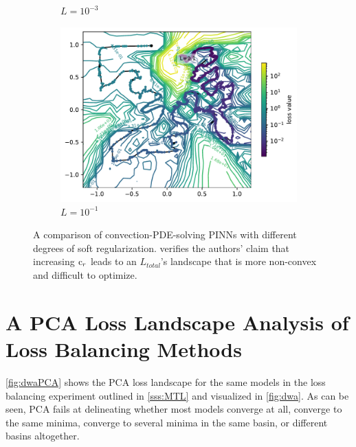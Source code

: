 \documentclass[letterpaper]{article} %
\begin{document}
\begin{figure}[hb]
\begin{subfigure}[b]{0.3\textwidth}
                \caption{$L=10^{-3}$}
            \end{subfigure}
            \hfill
            \begin{subfigure}[b]{0.3\textwidth}
                \centering
                \includegraphics[width=\textwidth]{figures/round3/Fails/L_/L-1.pdf}
                \caption{$L=10^{-1}$}
            \end{subfigure}
            
            \caption{A comparison of convection-PDE-solving PINNs with different degrees of soft regularization. \proposedautencoder{} verifies the authors' claim \cite{krishnapriyan2021characterizing} that increasing $\text{c}_{r}$ leads to an $L_{total}$'s landscape that is more non-convex and difficult to optimize.}
            \label{fig:FailsL}
        \end{figure}
   
    






    \section{A PCA Loss Landscape Analysis of Loss Balancing Methods} \label{app:MTLPCA}
         \cref{fig:dwaPCA} shows the PCA loss landscape for the same models in the loss balancing experiment outlined in \cref{sss:MTL} and visualized in \cref{fig:dwa}. As can be seen, PCA fails at delineating whether most models converge at all, converge to the same minima, converge to several minima in the same basin, or different basins altogether.
\end{document}
